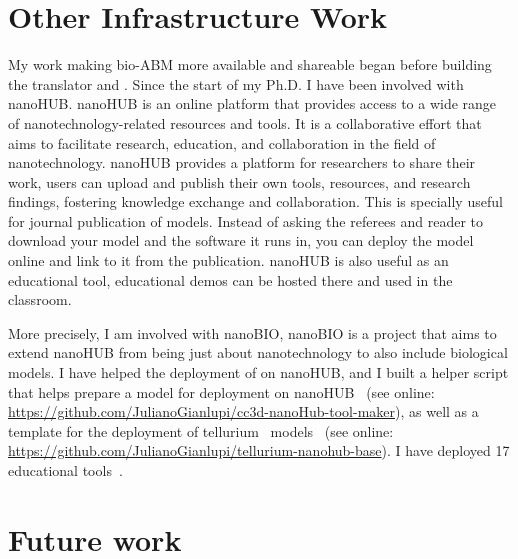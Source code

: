 \section{Other Infrastructure Work}
My work making bio-ABM more available and shareable began before building the translator and \pcp. Since the start of my Ph.D. I have been involved with nanoHUB. nanoHUB is an online platform that provides access to a wide range of nanotechnology-related resources and tools. It is a collaborative effort that aims to facilitate research, education, and collaboration in the field of nanotechnology. nanoHUB provides a platform for researchers to share their work, users can upload and publish their own tools, resources, and research findings, fostering knowledge exchange and collaboration. This is specially useful for journal publication of models. Instead of asking the referees and reader to download your model and the software it runs in, you can deploy the model online and link to it from the publication. nanoHUB is also useful as an educational tool, educational demos can be hosted there and used in the classroom. 

More precisely, I am involved with 
nanoBIO, nanoBIO is a project that aims to extend nanoHUB from being just about nanotechnology to also include biological models. I have helped the deployment of \ccds on nanoHUB, and I built a helper script that helps prepare a \ccds model for deployment on nanoHUB~\cite{gianlupi_script_2022} 
(see online: \url{https://github.com/JulianoGianlupi/cc3d-nanoHub-tool-maker}), as well as a template for the deployment of tellurium~\cite{choi_tellurium_2018} models~\cite{gianlupi_getting_2021-1} (see online: \url{https://github.com/JulianoGianlupi/tellurium-nanohub-base}). I have deployed 17 educational tools~\cite{ferrari_gianlupi_compucell3d_2023, ferrari_gianlupi_compucell3d_2022, ferrari_gianlupi_compucell3d_2019, ferrari_gianlupi_compucell3d_2023-1, ferrari_gianlupi_compucell3d_2019-1, ferrari_gianlupi_compucell3d_2020, ferrari_gianlupi_covid-19_2021, ferrari_gianlupi_compucell3d_2021, ferrari_gianlupi_focalpointplasticity_2021, ferrari_gianlupi_cancer_2021, sego_covid_2020, ferrari_gianlupi_compucell3d_2020-1, ferrari_gianlupi_compucell3d_2020-2, ferrari_gianlupi_compucell3d_2020-3, ferrari_gianlupi_compucell3d_2020-4, ferrari_gianlupi_compucell3d_2020-5, ferrari_gianlupi_compucell3d_2023-2, gianlupi_getting_2021-1}.

\section{Future work}\label{sec:disc:future}

